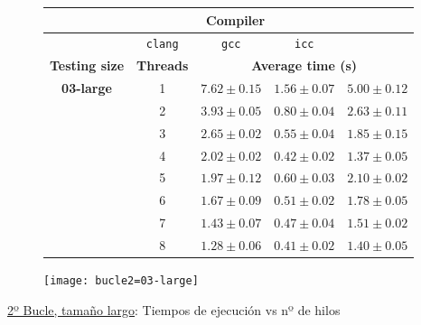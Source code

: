 \begin{figure}[H]
    \centering
    \begin{subfigure}{0.4\textwidth}
        \begin{adjustbox}{width=\textwidth} 
        \begin{tabular}{|c|c|c|c|c|}
            \hline
            \rowcolor{azul} \multicolumn{2}{|c|}{}&\multicolumn{3}{c|}{\textbf{Compiler}} \\ \hline
            \rowcolor{azul} \multicolumn{2}{|c|}{}&\texttt{clang}&\texttt{gcc}&\texttt{icc}\\ \hline
            \rowcolor{azul} \textbf{Testing size} & \textbf{Threads}&\multicolumn{3}{c|}{\textbf{Average time (s)}} \\ \hline
            \multirow{8}{1cm}{\textbf{03-large}} & 1 & \(7.62\pm{0.15}\) & \(1.56\pm{0.07}\) & \(5.00\pm{0.12}\) \\ \cline{2-5}
            & 2 & \(3.93\pm{0.05}\) & \(0.80\pm{0.04}\) & \(2.63\pm{0.11}\) \\ \cline{2-5}
            & 3 & \(2.65\pm{0.02}\) & \(0.55\pm{0.04}\) & \(1.85\pm{0.15}\) \\ \cline{2-5}
            & 4 & \(2.02\pm{0.02}\) & \(0.42\pm{0.02}\) & \(1.37\pm{0.05}\) \\ \cline{2-5}
            & 5 & \(1.97\pm{0.12}\) & \(0.60\pm{0.03}\) & \(2.10\pm{0.02}\) \\ \cline{2-5}
            & 6 & \(1.67\pm{0.09}\) & \(0.51\pm{0.02}\) & \(1.78\pm{0.05}\) \\ \cline{2-5}
            & 7 & \(1.43\pm{0.07}\) & \(0.47\pm{0.04}\) & \(1.51\pm{0.02}\) \\ \cline{2-5}
            & 8 & \(1.28\pm{0.06}\) & \(0.41\pm{0.02}\) & \(1.40\pm{0.05}\) \\ \hline
        \end{tabular}
        \end{adjustbox}
    \end{subfigure}
    \hfill
    \begin{subfigure}{0.5\textwidth}
        \texttt{[image: bucle2=03-large]}
    \end{subfigure}
    \caption{\underline{2º Bucle, tamaño largo}: Tiempos de ejecución vs nº de hilos}
    \label{bucle2=03-large}
\end{figure}

